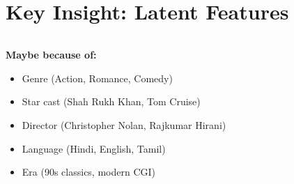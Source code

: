 \documentclass{beamer}
\begin{document}
\section{Key Insight: Latent Features}

\begin{frame}\begin{columns}[T]
\begin{column}{0.5\textwidth}
\textbf{Maybe because of:}
\begin{itemize}
\item Genre (Action, Romance, Comedy)
    \item Star cast (Shah Rukh Khan, Tom Cruise)
    \pause
\item Director (Christopher Nolan, Rajkumar Hirani)
    \item Language (Hindi, English, Tamil)
    \item Era (90s classics, modern CGI)
\end{itemize}
\end{column}
\begin{column}{0.5\textwidth}
\end{column}
\end{columns}
\end{frame}
\end{document}
